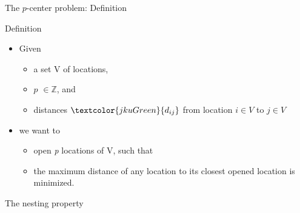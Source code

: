 \documentclass[utf8,aspectratio=169,ngerman,english]{beamer}
\renewcommand{\emph}[1]{\textcolor{jkuGreen}{#1}}
\newcommand{\pCP}{$p$CP}
\newcommand{\npCP}{n-$p$CP}
\begin{document}
\begin{frame}{The $p$-center problem: Definition}
\begin{block}{Definition}
    \begin{itemize}
        \item Given \pause
        \begin{itemize}
            \item a set V of locations, \pause
            \item \emph{$p$} $\in \mathbb{Z}$, and \pause
            \item \emph{distances} $\emph{d_{ij}}$ from location $i \in V$ to $j \in V$ \pause
        \end{itemize}
        \item we want to
        \begin{itemize}
            \item \emph{open \textit{p} locations} of V, such that \pause
            \item the \emph{maximum distance} of any location to its closest opened location is \emph{minimized}.
        \end{itemize}
    \end{itemize}
\end{block}
\end{frame}
\begin{frame}{The nesting property}

\end{frame}
\end{document}
